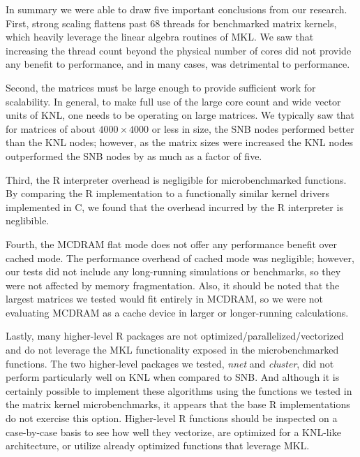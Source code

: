 In summary we were able to draw five important conclusions from our research.
First, strong scaling flattens past 68 threads for benchmarked matrix kernels,
  which heavily leverage the linear algebra routines of MKL.
We saw that increasing the thread count beyond the physical number of cores
  did not provide any benefit to performance, and in many cases, was
  detrimental to performance.

Second, the matrices must be large enough to provide sufficient work for
  scalability.
In general, to make full use of the large core count and wide vector units
  of KNL, one needs to be operating on large matrices.
We typically saw that for matrices of about $4000\times 4000$ or less in
  size, the SNB nodes performed better than the KNL nodes;
  however, as the matrix sizes were increased the KNL nodes outperformed
  the SNB nodes by as much as a factor of five.

Third, the R interpreter overhead is negligible for microbenchmarked functions.
By comparing the R implementation to a functionally similar kernel drivers
  implemented in C, we found that the overhead incurred by the R interpreter is
  neglibible.

Fourth, the MCDRAM flat mode does not offer any performance
  benefit over cached mode.
The performance overhead of cached mode was negligible; however, our tests
  did not include any long-running simulations or benchmarks, so they were
  not affected by memory fragmentation.
  Also, it should be noted that the largest matrices we tested would fit
  entirely in MCDRAM, so we were not evaluating MCDRAM as a cache device
  in larger or longer-running calculations.

Lastly, many higher-level R packages are not optimized/parallelized/vectorized
  and do not leverage the MKL functionality exposed in the microbenchmarked
  functions.
The two higher-level packages we tested, \textit{nnet} and \textit{cluster},
  did not perform particularly well on KNL when compared to SNB.
And although it is certainly possible to implement these algorithms using the
  functions we tested in the matrix kernel microbenchmarks, it appears that
  the base R implementations do not exercise this option.
Higher-level R functions should be inspected on a case-by-case basis to see
  how well they vectorize, are optimized for a KNL-like architecture, or
  utilize already optimized functions that leverage MKL.


